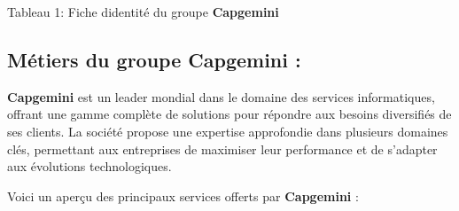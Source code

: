 \documentclass[12pt,a4paper,twoside]{report}
\begin{document}
\protect\hypertarget{_Toc203823475}{}{}Tableau 1: Fiche
d\textquotesingle identité du groupe \textbf{Capgemini}

\hypertarget{muxe9tiers-du-groupe-capgemini}{%
\subsection{Métiers du groupe Capgemini
:}\label{muxe9tiers-du-groupe-capgemini}}

\textbf{Capgemini} est un leader mondial dans le domaine des services
informatiques, offrant une gamme complète de solutions pour répondre aux
besoins diversifiés de ses clients. La société propose une expertise
approfondie dans plusieurs domaines clés, permettant aux entreprises de
maximiser leur performance et de s'adapter aux évolutions
technologiques.

Voici un aperçu des principaux services offerts par \textbf{Capgemini} :
\end{document}
